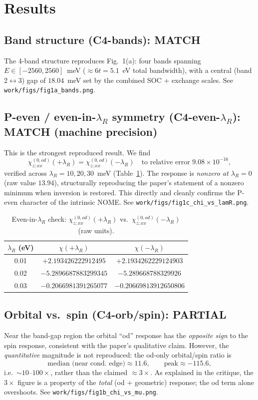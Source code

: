 \documentclass[11pt]{article}
\newcommand{\lamR}{\lambda_{R}}
\begin{document}
\section{Results}

\subsection{Band structure (C4-bands): MATCH}
The 4-band structure reproduces Fig.~1(a): four bands spanning
$E\in[-2560,2560]$~meV ($\approx 6t = 5.1$~eV total bandwidth), with a
central (band 2$\leftrightarrow$3) gap of $18.04$~meV set by the combined
SOC + exchange scales. See \texttt{work/figs/fig1a\_bands.png}.

\subsection{P-even / even-in-$\lamR$ symmetry (C4-even-$\lamR$): MATCH (machine precision)}
This is the strongest reproduced result. We find
\[
\chi^{(0,od)}_{z;xx}(+\lamR) = \chi^{(0,od)}_{z;xx}(-\lamR)
\quad\text{to relative error } 9.08\times10^{-16},
\]
verified across $\lamR = 10, 20, 30$~meV (Table~\ref{tab:even}). The
response is \emph{nonzero at $\lamR = 0$} (raw value $13.94$),
structurally reproducing the paper's statement of a nonzero minimum when
inversion is restored. This directly and cleanly confirms the P-even
character of the intrinsic NOME. See \texttt{work/figs/fig1c\_chi\_vs\_lamR.png}.

\begin{table}[h]
\centering
\caption{Even-in-$\lamR$ check: $\chi^{(0,od)}_{z;xx}(+\lamR)$ vs.\
$\chi^{(0,od)}_{z;xx}(-\lamR)$ (raw units).}
\label{tab:even}
\begin{tabular}{@{}c c c@{}}
\toprule
$\lamR$ (eV) & $\chi(+\lamR)$ & $\chi(-\lamR)$ \\
\midrule
0.01 & $+2.193426222912495$  & $+2.1934262229124903$ \\
0.02 & $-5.2896687883299345$ & $-5.289668788329926$  \\
0.03 & $-0.2066981391265077$ & $-0.20669813912650806$ \\
\bottomrule
\end{tabular}
\end{table}

\subsection{Orbital vs.\ spin (C4-orb/spin): PARTIAL}
Near the band-gap region the orbital ``od'' response has the
\emph{opposite sign} to the spin response, consistent with the paper's
qualitative claim. However, the \emph{quantitative} magnitude is not
reproduced: the od-only orbital/spin ratio is
\[
\text{median (near cond.\ edge)} \approx 11.6,\qquad
\text{peak} \approx -115.6,
\]
i.e.\ $\sim\!10$--$100\times$, rather than the claimed $\approx 3\times$.
As explained in the critique, the $3\times$ figure is a property of the
\emph{total} (od $+$ geometric) response; the od term alone overshoots.
See \texttt{work/figs/fig1b\_chi\_vs\_mu.png}.
\end{document}
